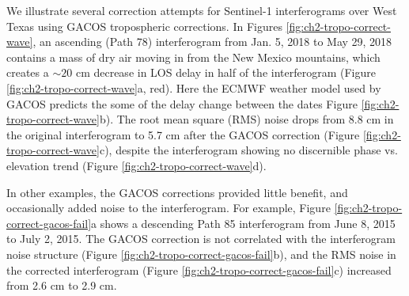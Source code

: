 We illustrate several correction attempts for Sentinel-1 interferograms over West Texas using GACOS tropospheric corrections.
In Figures \ref{fig:ch2-tropo-correct-wave}, an ascending (Path 78) interferogram from Jan. 5, 2018 to May 29, 2018 contains a mass of dry air moving in from the New Mexico mountains, which creates a $\sim 20$ cm decrease in LOS delay in half of the interferogram (Figure \ref{fig:ch2-tropo-correct-wave}a, red).
Here the ECMWF weather model used by GACOS predicts the some of the delay change between the dates Figure \ref{fig:ch2-tropo-correct-wave}b). 
The root mean square (RMS) noise drops from 8.8 cm in the original interferogram to 5.7 cm after the GACOS correction (Figure \ref{fig:ch2-tropo-correct-wave}c), despite the interferogram showing no discernible phase vs. elevation trend (Figure \ref{fig:ch2-tropo-correct-wave}d). 

 
In other examples, the GACOS corrections provided little benefit, and occasionally added noise to the interferogram. For example, Figure \ref{fig:ch2-tropo-correct-gacos-fail}a shows a descending Path 85 interferogram from June 8, 2015 to July 2, 2015. The GACOS correction is not correlated with the interferogram noise structure (Figure \ref{fig:ch2-tropo-correct-gacos-fail}b), and the RMS noise in the corrected interferogram (Figure \ref{fig:ch2-tropo-correct-gacos-fail}c) increased from 2.6 cm to 2.9 cm.


